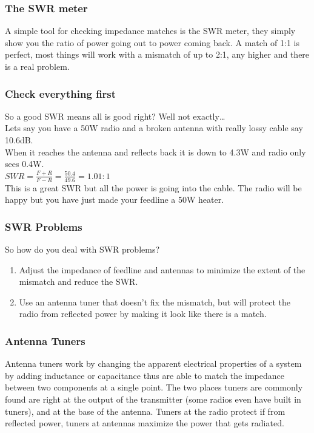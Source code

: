 \documentclass[10pt]{beamer}
\begin{document}
\begin{frame}
\frametitle{The SWR meter}
A simple tool for checking impedance matches is the SWR meter, they simply show you the ratio of power going out to power coming back. A match of 1:1 is perfect, most things will work with a mismatch of up to 2:1, any higher and there is a real problem.
\end{frame}

\begin{frame}
\frametitle{Check everything first}
So a good SWR means all is good right? \pause Well not exactly\ldots \\\pause
Lets say you have a 50W radio and a broken antenna with really lossy cable say 10.6dB.\\
When it reaches the antenna and reflects back it is down to 4.3W and radio only sees 0.4W.\\
$SWR=\frac{F+R}{F-R}=\frac{50.4}{49.6}=1.01:1$\\
This is a great SWR but all the power is going into the cable. The radio will be happy but you have just made your feedline a 50W heater.
\end{frame}

\begin{frame}
\frametitle{SWR Problems}
So how do you deal with SWR problems?\\
\begin{enumerate}
\item Adjust the impedance of feedline and antennas to minimize the extent of the mismatch and reduce the SWR.
\item Use an antenna tuner that doesn't fix the mismatch, but will protect the radio from reflected power by making it look like there is a match.
\end{enumerate}
\end{frame}

\begin{frame}
\frametitle{Antenna Tuners}
Antenna tuners work by changing the apparent electrical properties of a system by adding inductance or capacitance thus are able to match the impedance between two components at a single point. The two places tuners are commonly found are right at the output of the transmitter (some radios even have built in tuners), and at the base of the antenna. Tuners at the radio protect if from reflected power, tuners at antennas maximize the power that gets radiated.
\end{frame}
\end{document}
